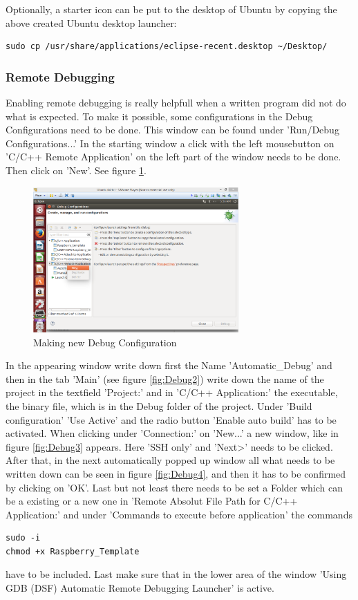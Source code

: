 Optionally, a starter icon can be put to the desktop of Ubuntu by copying the above created Ubuntu desktop launcher:
\begin{lstlisting}
sudo cp /usr/share/applications/eclipse-recent.desktop ~/Desktop/
\end{lstlisting}

\subsubsection{Remote Debugging}
\label{subsubsec:subsubsec-RD}

Enabling remote debugging is really helpfull when a written program did not do what is expected. To make it possible, some configurations in the Debug Configurations need to be done. This window can be found under 'Run/Debug Configurations...'
In the starting window a click with the left mousebutton on 'C/C++ Remote Application' on the left part of the window needs to be done. Then click on 'New'. See figure \ref{fig:Debug1}.

\begin{figure}[H]
	\centering\includegraphics[width=0.7\textwidth]{fig/Debug1}
	\caption{Making new Debug Configuration}
	\label{fig:Debug1}
\end{figure}

In the appearing window write down first the Name 'Automatic\_Debug' and then in the tab 'Main' (see figure \ref{fig:Debug2}) write down the name of the project in the textfield 'Project:' and in 'C/C++ Application:' the executable, the binary file, which is in the Debug folder of the project. Under 'Build configuration' 'Use Active' and the radio button 'Enable auto build' has to be activated. When clicking under 'Connection:' on 'New...' a new window, like in figure \ref{fig:Debug3} appears. Here 'SSH only' and 'Next>' needs to be clicked. After that, in the next automatically popped up window all what needs to be written down can be seen in figure \ref{fig:Debug4}, and then it has to be confirmed by clicking on 'OK'. Last but not least there needs to be set a Folder which can be a existing or a new one in 'Remote Absolut File Path for C/C++ Application:' and under 'Commands to execute before application' the commands
\begin{lstlisting}
sudo -i
chmod +x Raspberry_Template
\end{lstlisting}
have to be included. Last make sure that in the lower area of the window 'Using GDB (DSF) Automatic Remote Debugging Launcher' is active.

